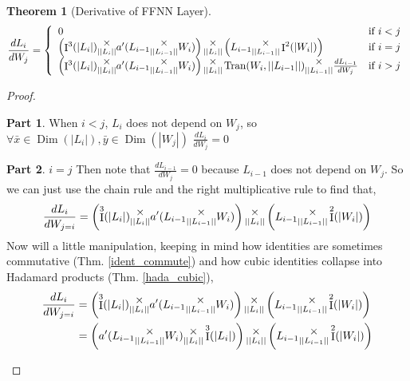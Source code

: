 \documentclass[12pt]{book}
\theoremstyle{plain}
\newtheorem{theorem}{Theorem}[chapter]
\theoremstyle{definition}
\theoremstyle{ppart}
\newtheorem{ppart}{Part}
\theoremstyle{case}
\theoremstyle{solution}
\DeclareMathOperator{\Dim}{Dim}
\DeclareMathOperator{\Ident}{I}
\DeclareMathOperator{\Tran}{Tran}
\newcommand{\mmult}[1]{\text{\raisebox{1ex}{$\underset{#1}{\times}$}}}
\newcommand{\shape}[1]{\left|#1\right|}
\begin{document}
\begin{landscape}
\begin{theorem}[Derivative of FFNN Layer]
\[
  \frac{dL_i}{dW_j}
	= \left\{
  \begin{array}{ll}
		0 & \mbox{if } i < j \\
    \left(\Ident^3(\shape{L_i}) \mmult{\shape{\shape{L_i}}} a'(L_{i-1} \mmult{\shape{\shape{L_{i-1}}}} W_i) \right) 
    \mmult{\shape{\shape{L_i}}}
    \left(L_{i-1} \mmult{\shape{\shape{L_{i-1}}}} \Ident^2(\shape{W_i})\right)
	  & \mbox{if } i = j \\
    \left(\Ident^3(\shape{L_i}) \mmult{\shape{\shape{L_i}}} a'(L_{i-1} \mmult{\shape{\shape{L_{i-1}}}} W_i) \right) 
    \mmult{\shape{\shape{L_i}}}
    \Tran(W_i, \shape{\shape{L_{i-1}}})
    \mmult{\shape{\shape{L_{i-1}}}}
    \frac{d L_{i-1}}{dW_j}
		& \mbox{if } i > j
  \end{array}
  \right.
\]
\end{theorem}
\begin{proof}
\begin{ppart} When $i < j$,
$L_i$ does not depend on $W_j$, so 
$\forall \bar{x} \in \Dim(\shape{L_i}), \bar{y} \in \Dim(\shape{W_j})$
$\frac{dL_i}{dW_j} = 0$
\end{ppart}
\begin{ppart} $i = j$
Then note that $\frac{dL_{i-1}}{dW_j} = 0$ because $L_{i-1}$ does not
depend on $W_j$. So we can just use the chain rule and the right multiplicative rule to find that,
\[
  \frac{dL_i}{dW_{j=i}} =
    \left(\Ident^3(\shape{L_i}) \mmult{\shape{\shape{L_i}}} a'(L_{i-1} \mmult{\shape{\shape{L_{i-1}}}} W_i) \right) 
    \mmult{\shape{\shape{L_i}}}
    \left(L_{i-1} \mmult{\shape{\shape{L_{i-1}}}} \Ident^2(\shape{W_i})\right)
\]
Now will a little manipulation, keeping in mind how identities are sometimes commutative (Thm. \ref{ident_commute})
and how cubic identities collapse into Hadamard products (Thm. \ref{hada_cubic}),
\begin{align*}
  \frac{dL_i}{dW_{j=i}}
  &=
    \left(\Ident^3(\shape{L_i}) \mmult{\shape{\shape{L_i}}} a'(L_{i-1} \mmult{\shape{\shape{L_{i-1}}}} W_i)\right) 
    \mmult{\shape{\shape{L_i}}}
    \left(L_{i-1} \mmult{\shape{\shape{L_{i-1}}}} \Ident^2(\shape{W_i})\right) \\
  &=
    \left(a'(L_{i-1} \mmult{\shape{\shape{L_{i-1}}}} W_i) \mmult{\shape{\shape{L_i}}} \Ident^3(\shape{L_i})\right) 
    \mmult{\shape{\shape{L_i}}}
    \left(L_{i-1} \mmult{\shape{\shape{L_{i-1}}}} \Ident^2(\shape{W_i})\right) \\

\end{align*}
\end{ppart}
\end{proof}
\end{landscape}
\end{document}
